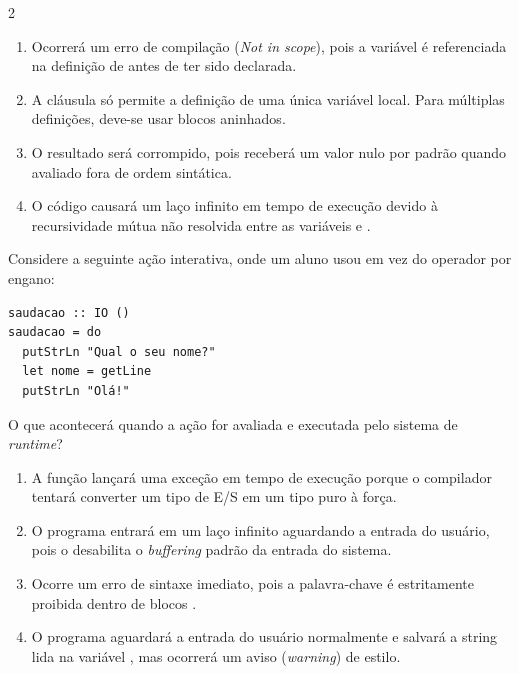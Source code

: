 \documentclass[a4paper,10pt,brazil]{article}
\begin{document}
\begin{multicols}{2}
\begin{enumerate}
  \item Ocorrerá um erro de compilação (\emph{Not in scope}), pois a variável  é referenciada na definição de  antes de ter sido declarada.

  \item A cláusula  só permite a definição de uma única variável local. Para múltiplas definições, deve-se usar blocos  aninhados.

  \item O resultado será corrompido, pois  receberá um valor nulo por padrão quando avaliado fora de ordem sintática.

  \item O código causará um laço infinito em tempo de execução devido à recursividade mútua não resolvida entre as variáveis  e .


\end{enumerate}

Considere a seguinte ação interativa, onde um aluno usou  em vez do operador \haskellinline{<-} por engano:

\begin{verbatim}
saudacao :: IO ()
saudacao = do
  putStrLn "Qual o seu nome?"
  let nome = getLine
  putStrLn "Olá!"
\end{verbatim}

O que acontecerá quando a ação  for avaliada e executada pelo sistema de \emph{runtime}?

\begin{enumerate}
  \item A função  lançará uma exceção em tempo de execução porque o compilador tentará converter um tipo de E/S em um tipo puro à força.

  \item O programa entrará em um laço infinito aguardando a entrada do usuário, pois o  desabilita o \emph{buffering} padrão da entrada do sistema.

  \item Ocorre um erro de sintaxe imediato, pois a palavra-chave  é estritamente proibida dentro de blocos .

  \item O programa aguardará a entrada do usuário normalmente e salvará a string lida na variável , mas ocorrerá um aviso (\emph{warning}) de estilo.


\end{enumerate}
\end{multicols}
\end{document}
